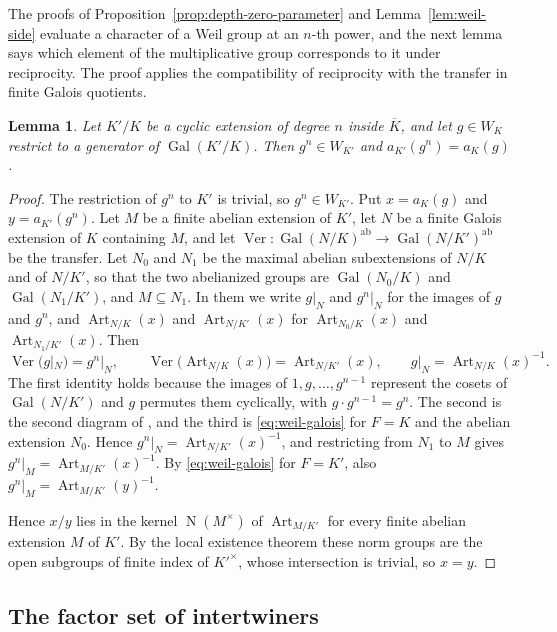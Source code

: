\documentclass[a4paper,11pt]{amsart}
\newtheorem{lemma}[theorem]{Lemma}
\theoremstyle{definition}
\theoremstyle{remark}
\numberwithin{equation}{section}
\DeclareMathOperator{\Gal}{Gal}
\DeclareMathOperator{\Ver}{Ver}
\DeclareMathOperator{\Art}{Art}
\DeclareMathOperator{\Nm}{N}
\begin{document}
The proofs of Proposition~\ref{prop:depth-zero-parameter} and Lemma~\ref{lem:weil-side} evaluate a character of a Weil group at an $n$-th power, and the next lemma says which element of the multiplicative group corresponds to it under reciprocity. The proof applies the compatibility of reciprocity with the transfer \cite[III, Lemma~3.2]{Mil20} in finite Galois quotients.

\begin{lemma}\label{lem:weil-power}
Let $K'/K$ be a cyclic extension of degree $n$ inside $\overline K$, and let $g\in W_K$ restrict to a generator of $\Gal(K'/K)$. Then $g^n\in W_{K'}$ and $a_{K'}(g^n)=a_K(g)$.
\end{lemma}

\begin{proof}
The restriction of $g^n$ to $K'$ is trivial, so $g^n\in W_{K'}$. Put $x=a_K(g)$ and $y=a_{K'}(g^n)$. Let $M$ be a finite abelian extension of $K'$, let $N$ be a finite Galois extension of $K$ containing $M$, and let $\Ver\colon\Gal(N/K)^{\mathrm{ab}}\to\Gal(N/K')^{\mathrm{ab}}$ be the transfer. Let $N_0$ and $N_1$ be the maximal abelian subextensions of $N/K$ and of $N/K'$, so that the two abelianized groups are $\Gal(N_0/K)$ and $\Gal(N_1/K')$, and $M\subseteq N_1$. In them we write $g|_N$ and $g^n|_N$ for the images of $g$ and $g^n$, and $\Art_{N/K}(x)$ and $\Art_{N/K'}(x)$ for $\Art_{N_0/K}(x)$ and $\Art_{N_1/K'}(x)$. Then
\[
 \Ver(g|_N)=g^n|_N,\qquad \Ver\bigl(\Art_{N/K}(x)\bigr)=\Art_{N/K'}(x),\qquad g|_N=\Art_{N/K}(x)^{-1}.
\]
The first identity holds because the images of $1,g,\dots,g^{n-1}$ represent the cosets of $\Gal(N/K')$ and $g$ permutes them cyclically, with $g\cdot g^{n-1}=g^n$. The second is the second diagram of \cite[III, Lemma~3.2]{Mil20}, and the third is \eqref{eq:weil-galois} for $F=K$ and the abelian extension $N_0$. Hence $g^n|_N=\Art_{N/K'}(x)^{-1}$, and restricting from $N_1$ to $M$ gives $g^n|_M=\Art_{M/K'}(x)^{-1}$. By \eqref{eq:weil-galois} for $F=K'$, also $g^n|_M=\Art_{M/K'}(y)^{-1}$.

Hence $x/y$ lies in the kernel $\Nm(M^\times)$ of $\Art_{M/K'}$ \cite[I, Theorem~1.1(b)]{Mil20} for every finite abelian extension $M$ of $K'$. By the local existence theorem \cite[I, Theorem~1.4]{Mil20} these norm groups are the open subgroups of finite index of $K'^\times$, whose intersection is trivial, so $x=y$.
\end{proof}

\subsection{The factor set of intertwiners}
\label{subsec:factor-set}
\end{document}
